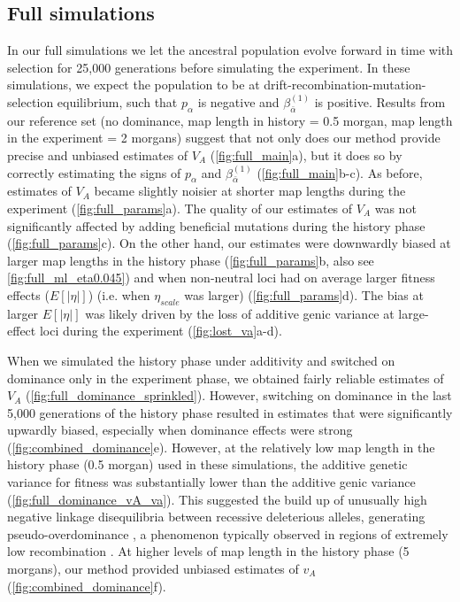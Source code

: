\documentclass[12pt]{article}
\begin{document}
\begin{bibunit}
\subsection*{Full simulations}
In our full simulations we let the ancestral population evolve forward in time with selection for 25,000 generations before simulating the experiment. In these simulations, we expect the population to be at drift-recombination-mutation-selection equilibrium, such that $p_{\alpha} $ is negative and $\beta^{(1)}_{\bar{\alpha}}$ is positive. Results from our reference set (no dominance, map length in history = 0.5 morgan, map length in the experiment = 2 morgans) suggest that not only does our method provide precise and unbiased estimates of $V_A$ (\ref{fig:full_main}a), but it does so by correctly estimating the signs of $p_{\alpha}$ and $\beta^{(1)}_{\bar{\alpha}}$ (\ref{fig:full_main}b-c). As before, estimates of $V_A$ became slightly noisier at shorter map lengths during the experiment (\ref{fig:full_params}a). The quality of our estimates of $V_A$ was not significantly affected by adding beneficial mutations during the history phase (\ref{fig:full_params}c). On the other hand, our estimates were downwardly biased at larger map lengths in the history phase (\ref{fig:full_params}b, also see \ref{fig:full_ml_eta0.045}) and when non-neutral loci had on average larger fitness effects ($E[|\eta|]$) (i.e. when $\eta_{scale}$ was larger) (\ref{fig:full_params}d). The bias at larger $E[|\eta|]$ was likely driven by the loss of additive genic variance at large-effect loci during the experiment (\ref{fig:lost_va}a-d).  

When we simulated the history phase under additivity and switched on dominance only in the experiment phase, we obtained fairly reliable estimates of $V_A$ (\ref{fig:full_dominance_sprinkled}). However, switching on dominance in the last 5,000 generations of the history phase resulted in estimates that were significantly upwardly biased, especially when dominance effects were strong (\ref{fig:combined_dominance}e). However, at the relatively low map length in the history phase (0.5 morgan) used in these simulations, the additive genetic variance for fitness was substantially lower than the additive genic variance (\ref{fig:full_dominance_vA_va}). This suggested the build up of unusually high negative linkage disequilibria between recessive deleterious alleles, generating pseudo-overdominance \citep{ohta1970development, abu2023conditions}, a phenomenon typically observed in regions of extremely low recombination \citep{salson2025interplay}. At higher levels of map length in the history phase (5 morgans), our method provided unbiased estimates of $v_A$ (\ref{fig:combined_dominance}f).     


\end{bibunit}
\end{document}
